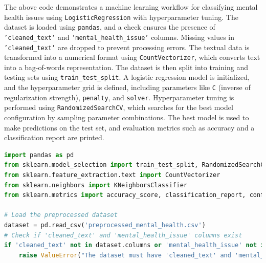 \noindent
The above code demonstrates a machine learning workflow for classifying mental health issues using \texttt{LogisticRegression} with hyperparameter tuning. The dataset is loaded using \texttt{pandas}, and a check ensures the presence of \texttt{'cleaned\_text'} and \texttt{'mental\_health\_issue'} columns. Missing values in \texttt{'cleaned\_text'} are dropped to prevent processing errors. The textual data is transformed into a numerical format using \texttt{CountVectorizer}, which converts text into a bag-of-words representation. The dataset is then split into training and testing sets using \texttt{train\_test\_split}. A logistic regression model is initialized, and the hyperparameter grid is defined, including parameters like \texttt{C} (inverse of regularization strength), \texttt{penalty}, and \texttt{solver}. Hyperparameter tuning is performed using \texttt{RandomizedSearchCV}, which searches for the best model configuration by sampling parameter combinations. The best model is used to make predictions on the test set, and evaluation metrics such as accuracy and a classification report are printed.

\begin{tcolorbox}[colback=gray!5!white, colframe=gray!80!black, boxrule=0.5pt, title=K Nearest Neighbours]
    \begin{lstlisting}[language=Python]
import pandas as pd
from sklearn.model_selection import train_test_split, RandomizedSearchCV
from sklearn.feature_extraction.text import CountVectorizer
from sklearn.neighbors import KNeighborsClassifier
from sklearn.metrics import accuracy_score, classification_report, confusion_matrix

# Load the preprocessed dataset
dataset = pd.read_csv('preprocessed_mental_health.csv')
# Check if 'cleaned_text' and 'mental_health_issue' columns exist
if 'cleaned_text' not in dataset.columns or 'mental_health_issue' not in dataset.columns:
    raise ValueError("The dataset must have 'cleaned_text' and 'mental_health_issue' columns.")
\end{lstlisting}
\end{tcolorbox}


